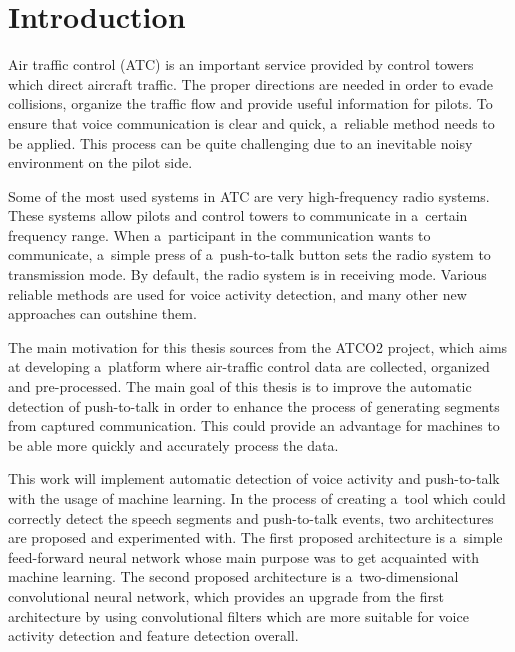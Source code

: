 
% 

\chapter{Introduction}\label{Introduction}


    Air traffic control (ATC) is an important service provided by control towers which direct aircraft traffic. The proper directions are needed in order to evade collisions, organize the traffic flow and provide useful information for pilots. To ensure that voice communication is clear and quick, a~reliable method needs to be applied. This process can be quite challenging due to an inevitable noisy environment on the pilot side. 

    Some of the most used systems in ATC are very high-frequency radio systems. These systems allow pilots and control towers to communicate in a~certain frequency range. When a~participant in the communication wants to communicate, a~simple press of a~push-to-talk button sets the radio system to transmission mode. By default, the radio system is in receiving mode. Various reliable methods are used for voice activity detection, and many other new approaches can outshine them. 

    The main motivation for this thesis sources from the ATCO2 project, which aims at developing a~platform where air-traffic control data are collected, organized and pre-processed. The main goal of this thesis is to improve the automatic detection of push-to-talk in order to enhance the process of generating segments from captured communication. This could provide an advantage for machines to be able more quickly and accurately process the data. 

    This work will implement automatic detection of voice activity and push-to-talk with the usage of machine learning. In the process of creating a~tool which could correctly detect the speech segments and push-to-talk events, two architectures are proposed and experimented with. The first proposed architecture is a~simple feed-forward neural network whose main purpose was to get acquainted with machine learning. The second proposed architecture is a~two-dimensional convolutional neural network, which provides an upgrade from the first architecture by using convolutional filters which are more suitable for voice activity detection and feature detection overall.

